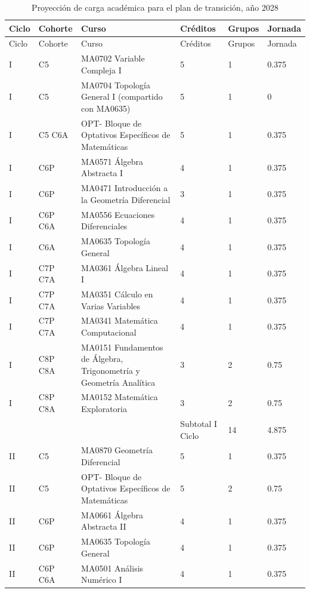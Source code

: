 \begin{longtable}[c]{|p{0.7cm}|p{1.6cm}|p{6.4cm}|p{1.5cm}|p{1.2cm}|p{1.4cm}|}
\caption{Proyección de carga académica para el plan de transición, año 2028}
\label{tab:carga2028}\\
\hline
\rowcolor[HTML]{00C0F3}
Ciclo & Cohorte & Curso & Créditos & Grupos & Jornada \\ \hline
\endfirsthead
\hline
\rowcolor[HTML]{00C0F3}
Ciclo & Cohorte & Curso & Créditos & Grupos & Jornada \\ \hline
\endhead
%
I & C5 & MA0702 Variable Compleja I & 5 & 1 & 0.375 \\ \hline
I & C5 & MA0704 Topología General I (compartido con MA0635) & 5 & 1 & 0 \\ \hline
I & C5 C6A & OPT- Bloque de Optativos Específicos de Matemáticas & 5 & 1 & 0.375 \\ \hline
I & C6P & MA0571 Álgebra Abstracta I & 4 & 1 & 0.375 \\ \hline
I & C6P & MA0471 Introducción a la Geometría Diferencial & 3 & 1 & 0.375 \\ \hline
I & C6P C6A & MA0556 Ecuaciones Diferenciales & 4 & 1 & 0.375 \\ \hline
I & C6A & MA0635 Topología General & 4 & 1 & 0.375 \\ \hline
I & C7P C7A & MA0361 Álgebra Lineal I & 4 & 1 & 0.375 \\ \hline
I & C7P C7A & MA0351 Cálculo en Varias Variables & 4 & 1 & 0.375 \\ \hline
I & C7P C7A & MA0341 Matemática Computacional & 4 & 1 & 0.375 \\ \hline
I & C8P C8A & MA0151 Fundamentos de Álgebra, Trigonometría y Geometría Analítica & 3 & 2 & 0.75 \\ \hline
I & C8P C8A & MA0152 Matemática Exploratoria & 3 & 2 & 0.75 \\ \hline
 &  &  & Subtotal I Ciclo & 14 & 4.875 \\ \hline
II & C5 & MA0870 Geometría Diferencial & 5 & 1 & 0.375 \\ \hline
II & C5 & OPT- Bloque de Optativos Específicos de Matemáticas & 5 & 2 & 0.75 \\ \hline
II & C6P & MA0661 Álgebra Abstracta II & 4 & 1 & 0.375 \\ \hline
II & C6P & MA0635 Topología General & 4 & 1 & 0.375 \\ \hline
II & C6P C6A & MA0501 Análisis Numérico I & 4 & 1 & 0.375 \\ \hline

\end{longtable}
